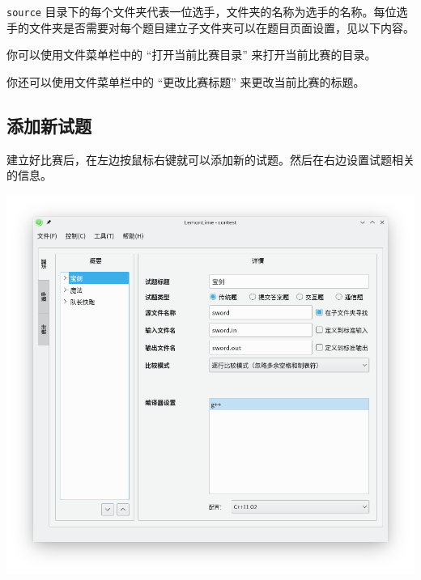 \documentclass[UTF-8]{ctexart}
\begin{document}
			\texttt{source} 目录下的每个文件夹代表一位选手，文件夹的名称为选手的名称。每位选手的文件夹是否需要对每个题目建立子文件夹可以在题目页面设置，见以下内容。

			你可以使用文件菜单栏中的 “打开当前比赛目录” 来打开当前比赛的目录。

			你还可以使用文件菜单栏中的 “更改比赛标题” 来更改当前比赛的标题。

		\subsection{添加新试题}

			建立好比赛后，在左边按鼠标右键就可以添加新的试题。然后在右边设置试题相关的信息。

			\begin{center}
			\includegraphics[scale=0.5]{pics/editproblem.png}
			\end{center}
\end{document}
